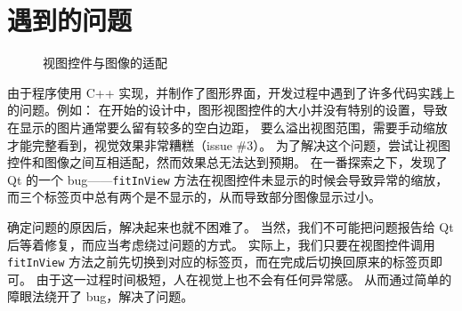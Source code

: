\documentclass{hitgsrep}
\begin{document}
\section{遇到的问题}

\begin{figure}[htb]
    \centering
    \hfill
    \caption{视图控件与图像的适配}
    \label{fig:fit}
\end{figure}

由于程序使用 C++ 实现，并制作了图形界面，开发过程中遇到了许多代码实践上的问题。例如：
在开始的设计中，图形视图控件的大小并没有特别的设置，导致在显示的图片通常要么留有较多的空白边距，
要么溢出视图范围，需要手动缩放才能完整看到，视觉效果非常糟糕（issue \#3）。
为了解决这个问题，尝试让视图控件和图像之间互相适配，然而效果总无法达到预期。
在一番探索之下，发现了 Qt 的一个 bug——\texttt{fitInView} 方法在视图控件未显示的时候会导致异常的缩放，
而三个标签页中总有两个是不显示的，从而导致部分图像显示过小。

确定问题的原因后，解决起来也就不困难了。
当然，我们不可能把问题报告给 Qt 后等着修复，而应当考虑绕过问题的方式。
实际上，我们只要在视图控件调用 \texttt{fitInView} 方法之前先切换到对应的标签页，而在完成后切换回原来的标签页即可。
由于这一过程时间极短，人在视觉上也不会有任何异常感。
从而通过简单的障眼法绕开了 bug，解决了问题。

\end{document}
